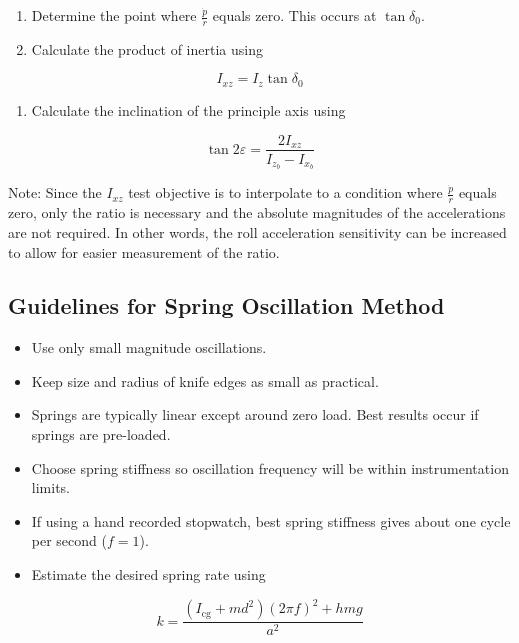 \documentclass[
]{book}
\providecommand{\tightlist}{%
  \setlength{\itemsep}{0pt}\setlength{\parskip}{0pt}}
\begin{document}
\begin{enumerate}
\def\labelenumi{\arabic{enumi}.}
\setcounter{enumi}{2}
\tightlist
\item
  Determine the point where \(\frac{\dot{p}}{\dot{r}}\) equals zero. This occurs at \(\tan{\delta_0}\).
\item
  Calculate the product of inertia using
\end{enumerate}

\[ I_{xz} = I_z \tan{\delta_0} \]

\begin{enumerate}
\def\labelenumi{\arabic{enumi}.}
\setcounter{enumi}{4}
\tightlist
\item
  Calculate the inclination of the principle axis using
\end{enumerate}

\[ \tan{2\varepsilon} = \frac{2I_{xz}}{I_{z_b} - I_{x_b}} \]

Note: Since the \(I_{xz}\) test objective is to interpolate to a condition where \(\frac{\dot{p}}{\dot{r}}\) equals zero, only the ratio is necessary and the absolute magnitudes of the accelerations are not required. In other words, the roll acceleration sensitivity can be increased to allow for easier measurement of the ratio.

\hypertarget{guidelines-for-spring-oscillation-method}{%
\subsection{Guidelines for Spring Oscillation Method}\label{guidelines-for-spring-oscillation-method}}

\begin{itemize}
\tightlist
\item
  Use only small magnitude oscillations.
\item
  Keep size and radius of knife edges as small as practical.
\item
  Springs are typically linear except around zero load. Best results occur if springs are pre-loaded.
\item
  Choose spring stiffness so oscillation frequency will be within instrumentation limits.
\item
  If using a hand recorded stopwatch, best spring stiffness gives about one cycle per second (\(f = 1\)).
\item
  Estimate the desired spring rate using
\end{itemize}

\[ k = \frac{ \left( I_{\mathrm{cg}} + md^2 \right) \left( 2 \pi f \right)^2 + hmg}{a^2} \]
\end{document}
